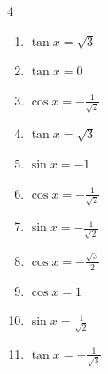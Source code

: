 \begin{multicols}{4}
\begin{enumerate}

  \item $\displaystyle \tan{x}  = \sqrt{3}$


\columnbreak %

  \item $\displaystyle \tan{x}  = 0$

        \phantom{$\displaystyle x = 0 , \pi$}

  \item $\displaystyle \cos{x}  = -\frac{1}{\sqrt{2}}$


  \item $\displaystyle \tan{x}  = \sqrt{3}$


  \item $\displaystyle \sin{x}  = -1$


  \item $\displaystyle \cos{x}  = -\frac{1}{\sqrt{2}}$


  \item $\displaystyle \sin{x}  = -\frac{1}{\sqrt{2}}$


  \item $\displaystyle \cos{x}  = -\frac{\sqrt{3}}{2}$


  \item $\displaystyle \cos{x}  = 1$

        \phantom{$\displaystyle x = 0$}

  \item $\displaystyle \sin{x}  = \frac{1}{\sqrt{2}}$


  \item $\displaystyle \tan{x}  = -\frac{1}{\sqrt{3}}$


\end{enumerate}
\end{multicols}
